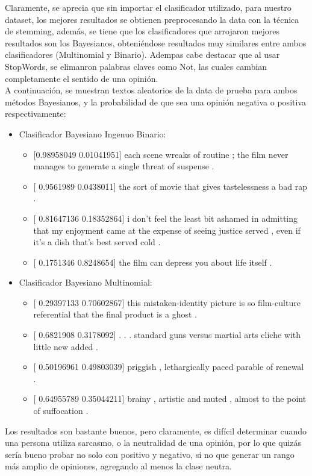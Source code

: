\documentclass[letter, 10pt]{article}
\begin{document}
Claramente, se aprecia que sin importar el clasificador utilizado, para nuestro dataset, los mejores resultados se obtienen preprocesando la data con la técnica de stemming, además, se tiene que los clasificadores que arrojaron mejores resultados son los Bayesianos, obteniéndose resultados muy similares entre ambos clasificadores (Multinomial y Binario). Adempas cabe destacar que al usar StopWords, se elimanron palabras claves como Not, las cuales cambian completamente el sentido de una opinión. \\
A continuación, se muestran textos aleatorios de la data de prueba para ambos métodos Bayesianos, y la probabilidad de que sea una opinión negativa o positiva respectivamente:\\
\begin{itemize}
  \item Clasificador Bayesiano Ingenuo Binario:
  \begin{itemize}
    \item  {[0.98958049  0.01041951]} each scene wreaks of routine ; the film never manages to generate a single threat of suspense .
    \item {[ 0.9561989  0.0438011]} the sort of movie that gives tastelessness a bad rap .
    \item {[ 0.81647136  0.18352864]} i don't feel the least bit ashamed in admitting that my enjoyment came at the expense of seeing justice served , even if it's a dish that's best served cold .
    \item {[ 0.1751346  0.8248654]} the film can depress you about life itself .
  \end{itemize}
  \item Clasificador Bayesiano Multinomial:
  \begin{itemize}
    \item {[ 0.29397133  0.70602867]} this mistaken-identity picture is so film-culture referential that the final product is a ghost .
    \item {[ 0.6821908  0.3178092]} . . . standard guns versus martial arts cliche with little new added .
    \item {[ 0.50196961  0.49803039]} priggish , lethargically paced parable of renewal .
    \item {[ 0.64955789  0.35044211]} brainy , artistic and muted , almost to the point of suffocation .
  \end{itemize}


\end{itemize}


Los resultados son bastante buenos, pero claramente, es difícil determinar cuando una persona utiliza sarcasmo, o la neutralidad de una opinión, por lo que quizás sería bueno probar no solo con positivo y negativo, si no que generar un rango más amplio de opiniones, agregando al menos la clase neutra. 
\end{document}
